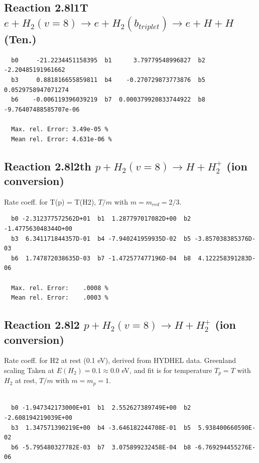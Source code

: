 \documentclass[12pt,dvipdfmx]{article}
\begin{document}
\subsection{
Reaction 2.8l1T
$ e +  H_2(v=8) \rightarrow e +  H_2(b_{triplet}) \rightarrow e + H + H $ (Ten.)
}


\begin{small}\begin{verbatim}
  b0     -21.2234451158395  b1      3.79779548996827  b2     -2.20485191961662
  b3     0.881816655859811  b4    -0.270729873773876  b5    0.0529758947071274
  b6    -0.006119396039219  b7  0.000379920833744922  b8 -9.76407488585707e-06

  Max. rel. Error: 3.49e-05 %
  Mean rel. Error: 4.631e-06 %
\end{verbatim}\end{small}


\subsection{
Reaction 2.8l2th
$ p + H_2(v=8) \rightarrow H + H_2^+$ (ion conversion)
}
Rate coeff. for T(p) = T(H2),
$T/m$ with $m=m_{red}=2/3$.

\begin{small}\begin{verbatim}
  b0 -2.312377572562D+01  b1  1.287797017082D+00  b2 -1.477563048344D+00
  b3  6.341171844357D-01  b4 -7.940241959935D-02  b5 -3.857038385376D-03
  b6  1.747872038635D-03  b7 -1.472577477196D-04  b8  4.122258391283D-06

  Max. rel. Error:    .0008 %
  Mean rel. Error:    .0003 %
\end{verbatim}\end{small}

\subsection{
Reaction 2.8l2
$ p + H_2(v=8) \rightarrow H + H_2^+$ (ion conversion)
}
Rate coeff. for H2 at rest (0.1 eV), derived from HYDHEL data. Greenland scaling
Taken at $E(H_2) = 0.1 \approx 0.0$ eV,  and fit is for temperature $T_p=T$ with $H_2$ at rest,
$T/m$ with $m=m_p=1$.

\begin{small}\begin{verbatim}

  b0 -1.947342173000E+01  b1  2.552627389749E+00  b2 -2.608194219039E+00
  b3  1.347571390219E+00  b4 -3.646182244708E-01  b5  5.938400660590E-02
  b6 -5.795480327782E-03  b7  3.075899232458E-04  b8 -6.769294455276E-06

\end{verbatim}\end{small}
\end{document}
